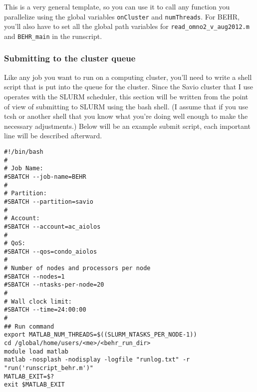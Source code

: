 \documentclass[12pt]{article}
\begin{document}
		This is a very general template, so you can use it to call any function you parallelize using the global variables \texttt{onCluster} and \texttt{numThreads}.  For BEHR, you'll also have to set all the global path variables for \texttt{read\_omno2\_v\_aug2012.m} and \texttt{BEHR\_main} in the runscript.
		
	\subsubsection{Submitting to the cluster queue} \label{sec:ClusterQueueMatlab}
		Like any job you want to run on a computing cluster, you'll need to write a shell script that is put into the queue for the cluster.  Since the Savio cluster that I use operates with the SLURM scheduler, this section will be written from the point of view of submitting to SLURM using the bash shell. (I assume that if you use tcsh or another shell that you know what you're doing well enough to make the necessary adjustments.) Below will be an example submit script, each important line will be described afterward.

\lstset{numbers=left}
\begin{lstlisting}
#!/bin/bash
#
# Job Name:
#SBATCH --job-name=BEHR
#
# Partition:
#SBATCH --partition=savio
#
# Account:
#SBATCH --account=ac_aiolos
# 
# QoS:
#SBATCH --qos=condo_aiolos
#
# Number of nodes and processors per node
#SBATCH --nodes=1
#SBATCH --ntasks-per-node=20
#
# Wall clock limit:
#SBATCH --time=24:00:00
#
## Run command
export MATLAB_NUM_THREADS=$((SLURM_NTASKS_PER_NODE-1))
cd /global/home/users/<me>/<behr_run_dir>
module load matlab
matlab -nosplash -nodisplay -logfile "runlog.txt" -r "run('runscript_behr.m')"
MATLAB_EXIT=$?
exit $MATLAB_EXIT
\end{lstlisting}
\lstset{numbers=none}
\end{document}
